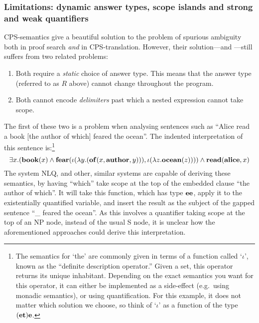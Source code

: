 \subsubsection{Limitations: dynamic answer types, scope islands and
  strong and weak quantifiers}
\label{sec:limitations}
 CPS-semantics give a beautiful solution to the
problem of spurious ambiguity both in proof search \emph{and} in
CPS-translation. However, their solution---and
---still suffers from two related problems:
\begin{enumerate}
\item Both require a \emph{static} choice of answer type. This
  means that the answer type (referred to as $R$ above) cannot change
  throughout the program.
\item Both cannot encode \emph{delimiters} past which a nested
  expression cannot take scope.
\end{enumerate}

The first of these two is a problem when analysing sentences such as
``Alice read a book [the author of which] feared the ocean''. The
indented interpretation of this sentence is:\footnote{%
  The semantics for `the' are commonly given in terms of a function
  called `$\iota$', known as the ``definite description operator.''
  Given a set, this operator returns its unique inhabitant. Depending
  on the exact semantics you want for this operator, it can either be
  implemented as a side-effect (e.g.\ using monadic semantics), or
  using quantification. For this example, it does not matter which
  solution we choose, so think of `$\iota$' as a function of the type
  $(\mathbf{e}\mathbf{t})\mathbf{e}$.
}
\[
  \exists x.(\mathbf{book}(x)\wedge \mathbf{fear}(\iota(\lambda
  y.(\mathbf{of}(x,\mathbf{author},y))),\iota(\lambda z.\mathbf{ocean}(z))))\wedge\mathbf{read}(\mathbf{alice},x)
\]
The system NLQ, and other, similar systems are capable of deriving
these semantics, by having ``which'' take scope at the top of the
embedded clause ``the author of which''. It will take this function,
which has type $\mathbf{e}\mathbf{e}$, apply it to the existentially quantified
variable, and insert the result as the subject of the gapped sentence
``\_ feared the ocean''. As this involves a quantifier taking scope at
the top of an NP node, instead of the usual S node, it is unclear how
the aforementioned approaches could derive this interpretation.

